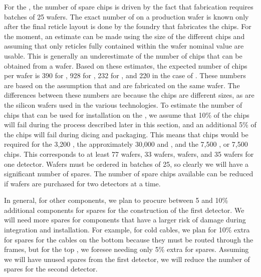 For the , the number of
spare chips is driven by the fact that fabrication requires
batches of 25 wafers. The exact number of  
on a production wafer is known only after the final reticle layout
is done by the foundry that fabricates the chips. For the moment,
an estimate can be made using the size of the different 
chips and assuming that only reticles fully contained
within the wafer nominal value are usable. This is generally
an underestimate of the number of chips that can be obtained 
from a wafer. Based on these estimates, the expected number
of chips per wafer is 390 for , 928 for , 
232 for , and 220 in the case of . 
These numbers are based on the assumption that 
and  are fabricated on the same wafer.
The differences between these numbers are because the chips 
are different sizes, as are the silicon wafers used in the various 
technologies. To estimate the number of chips that can be
used for installation on the , we assume that 10\% of 
the chips will fail during the 
process described later in this section, and an additional
5\% of the chips will fail during dicing and packaging. This means
that chips would be required for the 3,200 , the approximately 30,000  and
, and the 7,500 , or 7,500
 chips. This corresponds to at least 77  wafers,
33  wafers,  wafers, and 35  wafers for one
 detector. Wafers must be ordered
in batches of 25, so clearly we will have a significant number of
spares. The number of spare chips available can be 
reduced if wafers are purchased for two  detectors at a time. 

In general, for other components, we plan to procure between 5 and
10\% additional components for spares for the construction of the first 
detector. We will need more spares for components that have
a larger risk of damage during integration and 
installation. For example, for cold cables, we
plan for 10\% extra for spares for the cables on the bottom  because
they must be routed through the  frames, but
for the top , we foresee needing only 5\% extra for spares.
Assuming we will have unused spares from the first detector, we will reduce the number of spares for the second 
detector.

